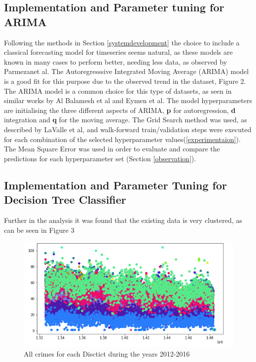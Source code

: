 \documentclass[a4paper, twocolumn]{article}
\begin{document}
\subsection{Implementation and Parameter tuning for ARIMA}\label{ARIMA}
Following the methods in Section \ref{systemdevelopment} the choice to include a classical forecasting model for timeseries seems natural, 
as these models are known in many cases to perform better, needing less data, as observed by Parmezanet al. \cite{test}
The Autoregresssive Integrated Moving Average (ARIMA) model is a good fit for this purpose due to the observed trend in the dataset, Figure 2.
The ARIMA model is a common choice for this type of datasets, as seen in similar works by Al Balamesh et al and Eymen et al. \cite{one} \cite{two} 
The model hyperparameters are initialising the three different aspects of ARIMA, \textbf{p} for autoregression, \textbf{d} integration and \textbf{q} for the moving average. 
The Grid Search method was used, as described by LaValle et al, \cite{lavalle2004relationship} and walk-forward train/validation steps were executed for each combination of the selected hyperparameter values(\ref{experimentaion}). 
The Mean Square Error was used in order to evaluate and compare the predictions for each hyperparameter set (Section \ref{observation}).

\subsection{Implementation and Parameter Tuning for Decision Tree Classifier}
Further in the analysis it was found that the existing data is very clustered, as can be seen in Figure 3

\begin{figure}[h]
    \label{figure:}
    \includegraphics[scale=0.3]{fig5.png}
    \caption{All crimes for each Disctict during the years 2012-2016}
\end{figure}
\end{document}
